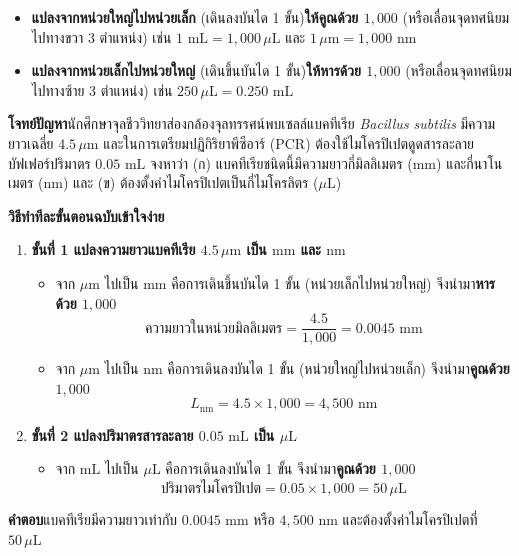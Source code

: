 \begin{conceptbox}
\begin{itemize}
    \item \textbf{แปลงจากหน่วยใหญ่ไปหน่วยเล็ก} (เดินลงบันได 1 ขั้น)\quad \textbf{ให้คูณด้วย $1{,}000$} (หรือเลื่อนจุดทศนิยมไปทางขวา 3 ตำแหน่ง) เช่น $1\text{ mL} = 1{,}000\,\mu\text{L}$ และ $1\,\mu\text{m} = 1{,}000\text{ nm}$
    \item \textbf{แปลงจากหน่วยเล็กไปหน่วยใหญ่} (เดินขึ้นบันได 1 ขั้น)\quad \textbf{ให้หารด้วย $1{,}000$} (หรือเลื่อนจุดทศนิยมไปทางซ้าย 3 ตำแหน่ง) เช่น $250\,\mu\text{L} = 0.250\text{ mL}$
\end{itemize}
\end{conceptbox}

\begin{worked}
\textbf{โจทย์ปัญหา}\quad นักศึกษาจุลชีววิทยาส่องกล้องจุลทรรศน์พบเซลล์แบคทีเรีย \textit{Bacillus subtilis} มีความยาวเฉลี่ย $4.5\,\mu\text{m}$ และในการเตรียมปฏิกิริยาพีซีอาร์ (PCR) ต้องใช้ไมโครปิเปตดูดสารละลายบัฟเฟอร์ปริมาตร $0.05\text{ mL}$ จงหาว่า (ก) แบคทีเรียชนิดนี้มีความยาวกี่มิลลิเมตร ($\text{mm}$) และกี่นาโนเมตร ($\text{nm}$) และ (ข) ต้องตั้งค่าไมโครปิเปตเป็นกี่ไมโครลิตร ($\mu\text{L}$)

\textbf{วิธีทำทีละขั้นตอนฉบับเข้าใจง่าย}
\begin{enumerate}
    \item \textbf{ขั้นที่ 1 แปลงความยาวแบคทีเรีย $4.5\,\mu\text{m}$ เป็น $\text{mm}$ และ $\text{nm}$}
    \begin{itemize}
        \item จาก $\mu\text{m}$ ไปเป็น $\text{mm}$ คือการเดินขึ้นบันได 1 ขั้น (หน่วยเล็กไปหน่วยใหญ่) จึงนำมา\textbf{หารด้วย $1{,}000$}
        \[
            \text{ความยาวในหน่วยมิลลิเมตร} = \frac{4.5}{1{,}000} = 0.0045\text{ mm}
        \]
        \item จาก $\mu\text{m}$ ไปเป็น $\text{nm}$ คือการเดินลงบันได 1 ขั้น (หน่วยใหญ่ไปหน่วยเล็ก) จึงนำมา\textbf{คูณด้วย $1{,}000$}
        \[
            L_{\text{nm}} = 4.5 \times 1{,}000 = 4{,}500\text{ nm}
        \]
    \end{itemize}
    \item \textbf{ขั้นที่ 2 แปลงปริมาตรสารละลาย $0.05\text{ mL}$ เป็น $\mu\text{L}$}
    \begin{itemize}
        \item จาก $\text{mL}$ ไปเป็น $\mu\text{L}$ คือการเดินลงบันได 1 ขั้น จึงนำมา\textbf{คูณด้วย $1{,}000$}
        \[
            \text{ปริมาตรไมโครปิเปต} = 0.05 \times 1{,}000 = 50\,\mu\text{L}
        \]
    \end{itemize}
\end{enumerate}
\textbf{คำตอบ}\quad แบคทีเรียมีความยาวเท่ากับ $0.0045\text{ mm}$ หรือ $4{,}500\text{ nm}$ และต้องตั้งค่าไมโครปิเปตที่ $50\,\mu\text{L}$
\end{worked}

